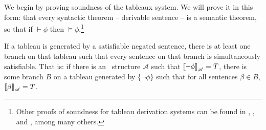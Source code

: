 We begin by proving soundness of the tableaux system. We will prove it in this form: that every syntactic theorem – derivable sentence – is a semantic theorem, so that if $\vdash \phi$ then $\vDash \phi$.\footnote{Other proofs of soundness for tableau derivation systems can be found in \citet[165–7]{bosintlo}, \citet[119]{hodges}, and \citet[33–4]{jefforlos}, among many others.}

\begin{lemma}\label{lemma1} If a tableau is generated by a satisfiable negated sentence, there is at least one branch on that tableau such that every sentence on that branch is simultaneously satisfiable. That is: if there is an \lone\ structure $\mathscr{A}$ such that $\left\llbracket \neg \phi\right\rrbracket_{\mathscr{A}} = T$, there is some branch $B$ on a tableau generated by $\{\neg\phi\}$ such that for all sentences $\beta \in B$, $\left\llbracket \beta\right\rrbracket_{\mathscr{A}} = T$.\end{lemma}

